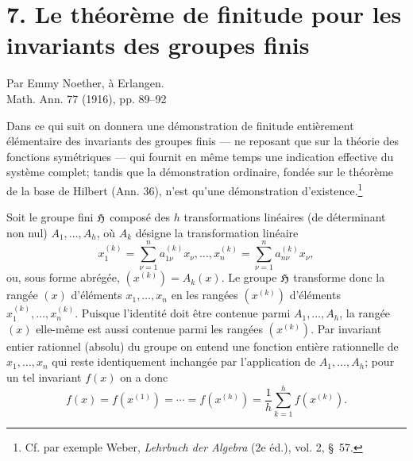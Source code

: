 \section*{7. Le théorème de finitude pour les invariants des groupes finis}
\begin{center}
Par Emmy Noether, à Erlangen.\\[0.75em]
Math. Ann. 77 (1916), pp. 89--92
\end{center}

Dans ce qui suit on donnera une démonstration de finitude entièrement élémentaire des invariants des groupes finis --- ne reposant que sur la théorie des fonctions symétriques --- qui fournit en même temps une indication effective du système complet; tandis que la démonstration ordinaire, fondée sur le théorème de la base de Hilbert (Ann. 36), n'est qu'une démonstration d'existence.\footnote{Cf. par exemple Weber, \emph{Lehrbuch der Algebra} (2e éd.), vol. 2, \S\ 57.}

Soit le groupe fini $\mathfrak{H}$ composé des $h$ transformations linéaires (de déterminant non nul) $A_1,\ldots,A_h$, où $A_k$ désigne la transformation linéaire
\[
  x_1^{(k)}=\sum_{\nu=1}^{n}a_{1\nu}^{(k)}x_\nu,\ldots,
  x_n^{(k)}=\sum_{\nu=1}^{n}a_{n\nu}^{(k)}x_\nu,
\]
ou, sous forme abrégée, $(x^{(k)})=A_k(x)$. Le groupe $\mathfrak{H}$ transforme donc la rangée $(x)$ d'éléments $x_1,\ldots,x_n$ en les rangées $(x^{(k)})$ d'éléments $x_1^{(k)},\ldots,x_n^{(k)}$. Puisque l'identité doit être contenue parmi $A_1,\ldots,A_h$, la rangée $(x)$ elle-même est aussi contenue parmi les rangées $(x^{(k)})$. Par invariant entier rationnel (absolu) du groupe on entend une fonction entière rationnelle de $x_1,\ldots,x_n$ qui reste identiquement inchangée par l'application de $A_1,\ldots,A_h$; pour un tel invariant $f(x)$ on a donc
\begin{equation}
  f(x)=f(x^{(1)})=\cdots=f(x^{(h)})=
  \frac1h\sum_{k=1}^{h}f(x^{(k)}).
\tag{1}
\end{equation}

